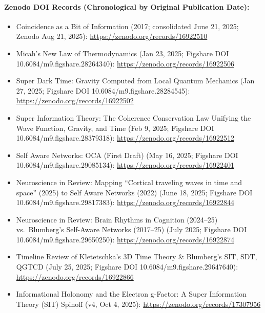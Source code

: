\documentclass[american,11pt,letterpaper]{article}
\def\texttt#1{#1}%
\def\emph#1{#1}%
\begin{document}
\paragraph{Zenodo DOI Records (Chronological by Original Publication Date):}
\begin{itemize}
  \item \emph{Coincidence as a Bit of Information} (2017; consolidated June 21, 2025; Zenodo Aug 21, 2025): \url{https://zenodo.org/records/16922510}
  \item \emph{Micah's New Law of Thermodynamics} (Jan 23, 2025; Figshare DOI \texttt{10.\allowbreak{}6084/m9.\allowbreak{}figshare.\allowbreak{}28264340}): \url{https://zenodo.org/records/16922506}
  \item \emph{Super Dark Time: Gravity Computed from Local Quantum Mechanics} (Jan 27, 2025; Figshare DOI \texttt{10.\allowbreak{}6084/m9.\allowbreak{}figshare.\allowbreak{}28284545}): \url{https://zenodo.org/records/16922502}
  \item \emph{Super Information Theory: The Coherence Conservation Law Unifying the Wave Function, Gravity, and Time} (Feb 9, 2025; Figshare DOI \texttt{10.\allowbreak{}6084/m9.\allowbreak{}figshare.\allowbreak{}28379318}): \url{https://zenodo.org/records/16922512}
  \item \emph{Self Aware Networks: OCA (First Draft)} (May 16, 2025; Figshare DOI \texttt{10.\allowbreak{}6084/m9.\allowbreak{}figshare.\allowbreak{}29085134}): \url{https://zenodo.org/records/16922401}
  \item \emph{Neuroscience in Review: Mapping ``Cortical traveling waves in time and space'' (2025) to Self Aware Networks (2022)} (June 18, 2025; Figshare DOI \texttt{10.\allowbreak{}6084/m9.\allowbreak{}figshare.\allowbreak{}29817383}): \url{https://zenodo.org/records/16922844}
  \item \emph{Neuroscience in Review: Brain Rhythms in Cognition (2024--25) vs.\ Blumberg's Self-Aware Networks (2017--25)} (July 2025; Figshare DOI \texttt{10.\allowbreak{}6084/m9.\allowbreak{}figshare.\allowbreak{}29650250}): \url{https://zenodo.org/records/16922874}
  \item \emph{Timeline Review of Kletetschka's 3D Time Theory \& Blumberg's SIT, SDT, QGTCD} (July 25, 2025; Figshare DOI \texttt{10.\allowbreak{}6084/m9.\allowbreak{}figshare.\allowbreak{}29647640}): \url{https://zenodo.org/records/16922866}
  \item \emph{Informational Holonomy and the Electron g-Factor: A Super Information Theory (SIT) Spinoff} (v4, Oct 4, 2025): \url{https://zenodo.org/records/17307956}

\end{itemize}
\end{document}
